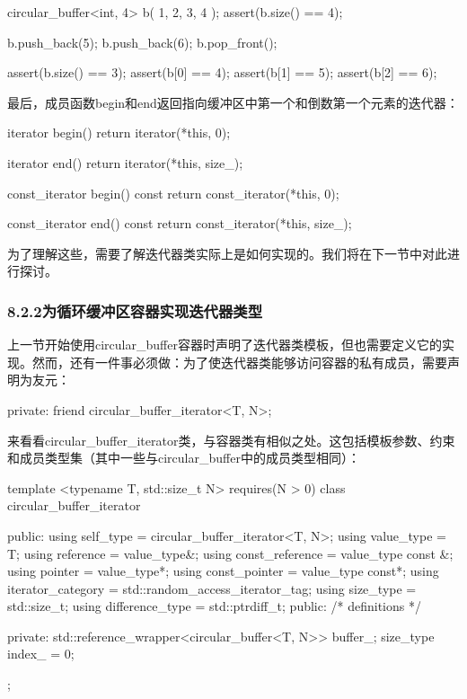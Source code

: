 \begin{cpp}
circular_buffer<int, 4> b({ 1, 2, 3, 4 });
assert(b.size() == 4);

b.push_back(5);
b.push_back(6);
b.pop_front();

assert(b.size() == 3);
assert(b[0] == 4);
assert(b[1] == 5);
assert(b[2] == 6);
\end{cpp}

最后，成员函数begin和end返回指向缓冲区中第一个和倒数第一个元素的迭代器：

\begin{cpp}
iterator begin()
{
	return iterator(*this, 0);
}

iterator end()
{
	return iterator(*this, size_);
}

const_iterator begin() const
{
	return const_iterator(*this, 0);
}

const_iterator end() const
{
	return const_iterator(*this, size_);
}
\end{cpp}

为了理解这些，需要了解迭代器类实际上是如何实现的。我们将在下一节中对此进行探讨。

\subsubsection{8.2.2\hspace{0.2cm}为循环缓冲区容器实现迭代器类型}

上一节开始使用circular\_buffer容器时声明了迭代器类模板，但也需要定义它的实现。然而，还有一件事必须做：为了使迭代器类能够访问容器的私有成员，需要声明为友元：

\begin{cpp}
private:
	friend circular_buffer_iterator<T, N>;
\end{cpp}

来看看circular\_buffer\_iterator类，与容器类有相似之处。这包括模板参数、约束和成员类型集（其中一些与circular\_buffer中的成员类型相同）：

\begin{cpp}
template <typename T, std::size_t N>
requires(N > 0)
class circular_buffer_iterator
{
public:
	using self_type = circular_buffer_iterator<T, N>;
	using value_type = T;
	using reference = value_type&;
	using const_reference = value_type const &;
	using pointer = value_type*;
	using const_pointer = value_type const*;
	using iterator_category =
		std::random_access_iterator_tag;
	using size_type = std::size_t;
	using difference_type = std::ptrdiff_t;
public:
	/* definitions */
	
private:
	std::reference_wrapper<circular_buffer<T, N>> buffer_;
	size_type index_ = 0;
};
\end{cpp}

